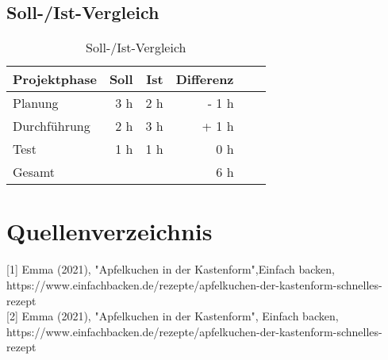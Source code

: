\subsection{Soll-/Ist-Vergleich}
\begin{table}[h]
    \centering
    \begin{tabular}{l*{4}{r}r|}
        \hline
        Projektphase    & Soll & Ist & Differenz\\
        \hline
        Planung & 3 h & 2 h & - 1 h\\
        Durchführung    & 2 h & 3 h & + 1 h \\
        Test      & 1 h & 1 h & 0 h   \\
        \hline
        Gesamt & & & 6 h \\
        \hline
        \end{tabular}
        \caption{Soll-/Ist-Vergleich}
\end{table}
\newpage
\section{Quellenverzeichnis}
[1] Emma (2021), "Apfelkuchen in der Kastenform",Einfach backen, https://www.einfachbacken.de/rezepte/apfelkuchen-der-kastenform-schnelles-rezept
\\[5pt]
[2] Emma (2021), "Apfelkuchen in der Kastenform", Einfach backen, https://www.einfachbacken.de/rezepte/apfelkuchen-der-kastenform-schnelles-rezept
